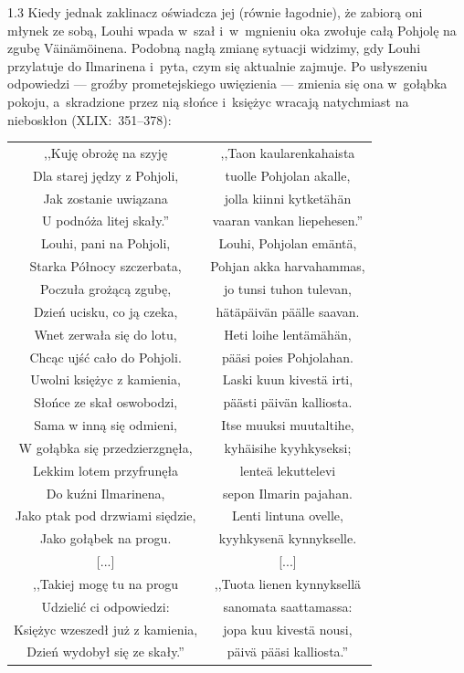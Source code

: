 \documentclass[11pt,a4paper,twoside]{report}
\begin{document}
\begin{spacing}{1.3}
Kiedy jednak zaklinacz oświadcza jej (równie łagodnie), że zabiorą oni młynek ze sobą, Louhi wpada w~szał i~w~mgnieniu oka zwołuje całą Pohjolę na zgubę Väinämöinena. Podobną nagłą zmianę sytuacji widzimy, gdy Louhi przylatuje do Ilmarinena i~pyta, czym się aktualnie zajmuje. Po usłyszeniu odpowiedzi --- groźby prometejskiego uwięzienia --- zmienia się ona w~gołąbka pokoju, a~skradzione przez nią słońce i~księżyc wracają natychmiast na nieboskłon (XLIX:~351--378):
\end{spacing}
{\centering
\small
\begin{longtable}{c c}
,,Kuję obrożę na szyję & ,,Taon kaularenkahaista \\
Dla starej jędzy z Pohjoli, & tuolle Pohjolan akalle, \\
Jak zostanie uwiązana & jolla kiinni kytketähän \\
U podnóża litej skały.'' & vaaran vankan liepehesen.'' \\
Louhi, pani na Pohjoli, & Louhi, Pohjolan emäntä, \\
Starka Północy szczerbata, & Pohjan akka harvahammas, \\
Poczuła grożącą zgubę, & jo tunsi tuhon tulevan, \\
Dzień ucisku, co ją czeka, & hätäpäivän päälle saavan. \\
Wnet zerwała się do lotu, & Heti loihe lentämähän, \\
Chcąc ujść cało do Pohjoli. & pääsi poies Pohjolahan. \\
Uwolni księżyc z kamienia, & Laski kuun kivestä irti, \\
Słońce ze skał oswobodzi, & päästi päivän kalliosta. \\
Sama w inną się odmieni, & Itse muuksi muutaltihe, \\
W gołąbka się przedzierzgnęła, & kyhäisihe kyyhkyseksi; \\
Lekkim lotem przyfrunęła & lenteä lekuttelevi \\
Do kuźni Ilmarinena, & sepon Ilmarin pajahan. \\
Jako ptak pod drzwiami siędzie, & Lenti lintuna ovelle, \\
Jako gołąbek na progu. & kyyhkysenä kynnykselle. \\
{[...]} & {[...]} \\ \newpage
,,Takiej mogę tu na progu & ,,Tuota lienen kynnyksellä \\
Udzielić ci odpowiedzi: & sanomata saattamassa: \\
Księżyc wzeszedł już z kamienia, & jopa kuu kivestä nousi, \\
Dzień wydobył się ze skały.'' & päivä pääsi kalliosta.'' \\
\end{longtable}
}
\end{document}
